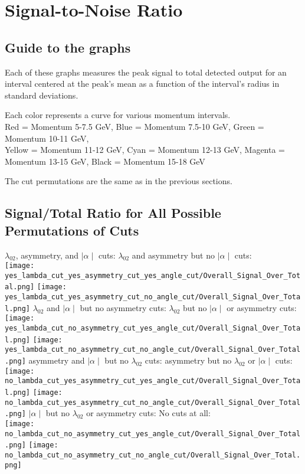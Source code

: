 \documentclass[11pt]{article}
\begin{document}
\section{Signal-to-Noise Ratio}
\subsection{Guide to the graphs} %
Each of these graphs measures the peak signal to total detected output for an interval centered at the peak's mean as a function of the interval's radius in standard deviations.

Each color represents a curve for various momentum intervals.\\
Red = Momentum 5-7.5 GeV, Blue = Momentum 7.5-10 GeV, Green = Momentum 10-11 GeV, \\
Yellow = Momentum 11-12 GeV, Cyan = Momentum 12-13 GeV, Magenta = Momentum 13-15 GeV, Black =  Momentum 15-18 GeV

The cut permutations are the same as in the previous sections.

\subsection{Signal/Total Ratio for All Possible Permutations of Cuts} %
\begin{frame}{}
$\lambda_{02}$, asymmetry, and $\mid\alpha\mid$ cuts:
\noindent\hspace{1 cm}$\lambda_{02}$ and asymmetry but no $\mid\alpha\mid$ cuts:\\
\texttt{[image: yes\_lambda\_cut\_yes\_asymmetry\_cut\_yes\_angle\_cut/Overall\_Signal\_Over\_Total.png]}
\texttt{[image: yes\_lambda\_cut\_yes\_asymmetry\_cut\_no\_angle\_cut/Overall\_Signal\_Over\_Total.png]}
$\lambda_{02}$ and $\mid\alpha\mid$ but no asymmetry cuts:
\noindent\hspace{1 cm}$\lambda_{02}$ but no $\mid\alpha\mid$ or asymmetry cuts:\\
\texttt{[image: yes\_lambda\_cut\_no\_asymmetry\_cut\_yes\_angle\_cut/Overall\_Signal\_Over\_Total.png]}
\texttt{[image: yes\_lambda\_cut\_no\_asymmetry\_cut\_no\_angle\_cut/Overall\_Signal\_Over\_Total.png]}
asymmetry and $\mid\alpha\mid$ but no $\lambda_{02}$ cuts:
\noindent\hspace{1 cm}asymmetry but no $\lambda_{02}$ or $\mid\alpha\mid$ cuts:\\
\texttt{[image: no\_lambda\_cut\_yes\_asymmetry\_cut\_yes\_angle\_cut/Overall\_Signal\_Over\_Total.png]}
\texttt{[image: no\_lambda\_cut\_yes\_asymmetry\_cut\_no\_angle\_cut/Overall\_Signal\_Over\_Total.png]}
$\mid\alpha\mid$ but no $\lambda_{02}$ or asymmetry cuts:
\noindent\hspace{1 cm} No cuts at all:\\
\texttt{[image: no\_lambda\_cut\_no\_asymmetry\_cut\_yes\_angle\_cut/Overall\_Signal\_Over\_Total.png]}
\texttt{[image: no\_lambda\_cut\_no\_asymmetry\_cut\_no\_angle\_cut/Overall\_Signal\_Over\_Total.png]}
\end{frame}
\end{document}
